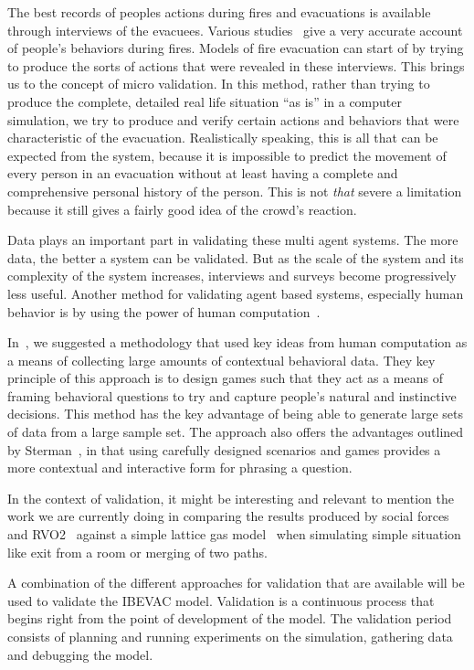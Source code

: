 The best records of peoples actions during fires and evacuations is available through interviews of the evacuees. Various studies~\cite{Torres:2010tj,Cocking:2007wp,Kobes:2009jx,Purser:2001ts} give a very accurate account of people's behaviors during fires. Models of fire evacuation can start of by trying to produce the sorts of actions that were revealed in these interviews. This brings us to the concept of micro validation. In this method, rather than trying to produce the complete, detailed real life situation ``as is'' in a computer simulation, we try to produce and verify certain actions and behaviors that were characteristic of the evacuation. Realistically speaking, this is all that can be expected from the system, because it is impossible to predict the movement of every person in an evacuation without at least having a complete and comprehensive personal history of the person. This is not \emph{that} severe a limitation because it still gives a fairly good idea of the crowd's reaction.

Data plays an important part in validating these multi agent systems. The more data, the better a system can be validated. But as the scale of the system and its complexity of the system increases, interviews and surveys become progressively less useful. Another method for validating agent based systems, especially human behavior is by using the power of human computation~\cite{VonAhn:2007wi}. 

In~\cite{Pengfei:2011us}, we suggested a methodology that used key ideas from human computation as a means of collecting large amounts of contextual behavioral data. They key principle of this approach is to design games such that they act as a means of framing behavioral questions to try and capture people's natural and instinctive decisions. This method has the key advantage of being able to generate large sets of data from a large sample set. The approach also offers the advantages outlined by Sterman~\cite{Sterman:1987vk}, in that using carefully designed scenarios and games provides a more contextual and interactive form for phrasing a question.

In the context of validation, it might be interesting and relevant to mention the work we are currently doing in comparing the results produced by social forces~\cite{Helbing:2000ef} and RVO2~\cite{Guy:2010ko} against a simple lattice gas model~\cite{Nagai:2004kl} when simulating simple situation like exit from a room or merging of two paths.

A combination of the different approaches for validation that are available will be used to validate the IBEVAC model. Validation is a continuous process that begins right from the point of development of the model. The validation period consists of planning and running experiments on the simulation, gathering data and debugging the model. 

